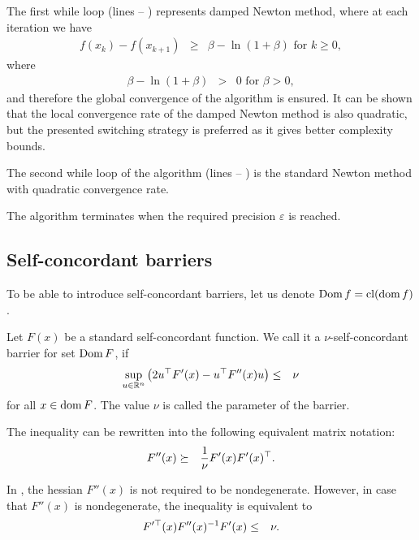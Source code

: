The first while loop (lines  -- ) represents damped Newton method, where at each iteration we have
\begin{eqnarray}
  f(x_k) - f(x_{k+1}) &\geq& \beta - \ln(1+\beta) \text{ for } k \geq 0,
\end{eqnarray}
where
\begin{eqnarray}
  \beta - \ln(1+\beta) &>& 0 \text{ for } \beta > 0,
\end{eqnarray}
and therefore the global convergence of the algorithm is ensured.
It can be shown that the local convergence rate of the damped Newton method is also quadratic, but the presented switching strategy is preferred as it gives better complexity bounds.

The second while loop of the algorithm (lines  -- ) is the standard Newton method with quadratic convergence rate.

The algorithm terminates when the required precision $\varepsilon$ is reached.


\subsection{Self-concordant barriers}
To be able to introduce self-concordant barriers, let us denote $\operatorname{Dom} f = \operatorname{cl}(\operatorname{dom} f)$.

\begin{definition}
  Let $F(x)$ be a standard self-concordant function. We call it a $\nu$-self-concordant barrier for set $\operatorname{Dom} F$, if
  \begin{eqnarray}
    \sup_{u\in\R^n} \big(2u^\top F'(x) - u^\top F''(x) u\big) &\leq& \nu \labeleq{SDP:scb:def}
  \end{eqnarray}
  for all $x\in\operatorname{dom} F$. The value $\nu$ is called the parameter of the barrier.
\end{definition}

The inequality  can be rewritten into the following equivalent matrix notation:
\begin{eqnarray}
  F''(x) &\succeq& \frac{1}{\nu}F'(x)F'(x)^\top.\labeleq{SDP:scb:def1}
\end{eqnarray}

In , the hessian $F''(x)$ is not required to be nondegenerate. However, in case that $F''(x)$ is nondegenerate, the inequality  is equivalent to
\begin{eqnarray}
  F'^\top(x)F''(x)^{-1}F'(x) &\leq& \nu.\labeleq{SDP:scb:def2}
\end{eqnarray}

